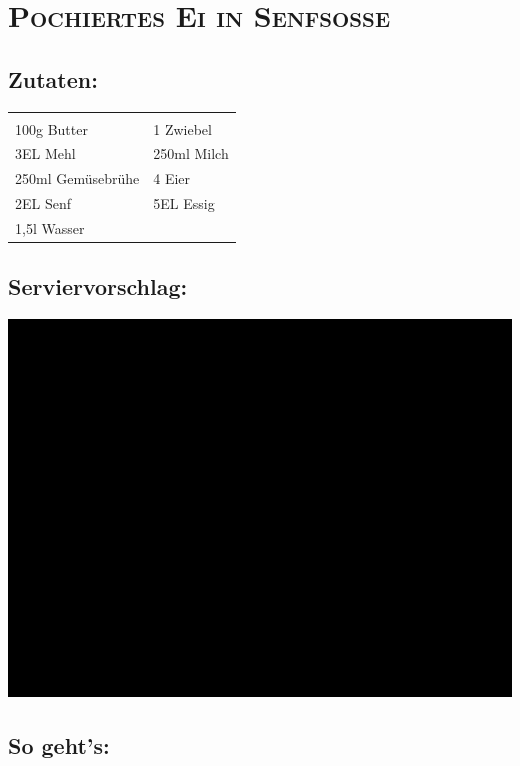 \section{\textsc{Pochiertes Ei in Senfsoße}}

\subsection*{Zutaten:}

\begin{tabular}{p{7.5cm} p{7.5cm}}
	& \\
	100g Butter & 1 Zwiebel \\
	3EL Mehl & 250ml Milch \\
  250ml Gemüsebrühe & 4 Eier \\
  2EL Senf & 5EL Essig \\
  1,5l Wasser &
\end{tabular}

\subsection*{Serviervorschlag:}

\includegraphics[width=\textwidth]{img/ph.jpg} \cite{eisenfsosse}

\subsection*{So geht's:}

